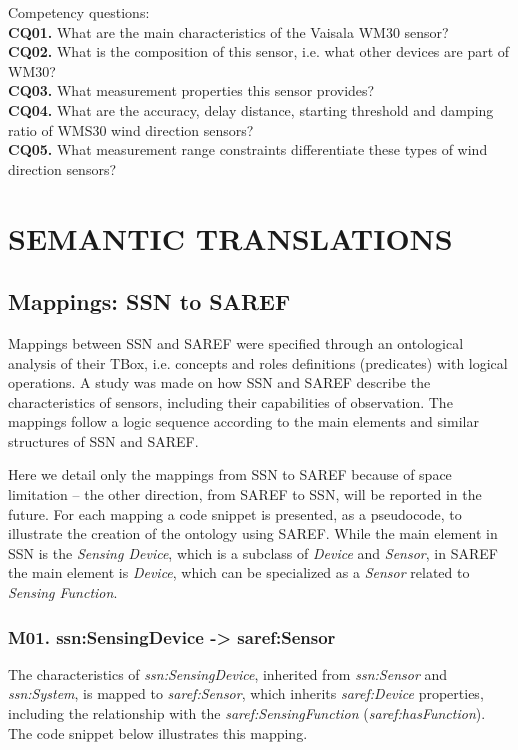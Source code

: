 \documentclass{sig-alternate-05-2015}
\begin{document}
Competency questions: 
\\\textbf{CQ01.} What are the main characteristics of the Vaisala WM30 sensor? 
\\\textbf{CQ02.} What is the composition of this sensor, i.e. what other devices are part of WM30?
\\\textbf{CQ03.} What measurement properties this sensor provides?
\\\textbf{CQ04.} What are the accuracy, delay distance, starting threshold and damping ratio of WMS30 wind direction sensors? 
\\\textbf{CQ05.} What measurement range constraints differentiate these types of wind direction sensors?

\section{SEMANTIC TRANSLATIONS}

\subsection{Mappings: SSN to SAREF}
Mappings between SSN and SAREF were specified through an ontological analysis of their TBox, i.e. concepts and roles definitions (predicates) with logical operations. A study was made on how SSN and SAREF describe the characteristics of sensors, including their capabilities of observation. The mappings follow a logic sequence according to the main elements and similar structures of SSN and SAREF. 

Here we detail only the mappings from SSN to SAREF because of space limitation – the other direction, from SAREF to SSN, will be reported in the future. For each mapping a code snippet is presented, as a pseudocode, to illustrate the creation of the ontology using SAREF. While the main element in SSN is the \textit{Sensing Device}, which is a subclass of \textit{Device} and \textit{Sensor}, in SAREF the main element is \textit{Device}, which can be specialized as a \textit{Sensor} related to \textit{Sensing Function}. 

\subsubsection{M01. ssn:SensingDevice -> saref:Sensor}
The characteristics of \textit{ssn:SensingDevice}, inherited from \textit{ssn:Sensor} and \textit{ssn:System}, is mapped to \textit{saref:Sensor}, which inherits \textit{saref:Device} properties, including the relationship with the \textit{saref:SensingFunction} (\textit{saref:hasFunction}). The code snippet below illustrates this mapping. 
\end{document}
